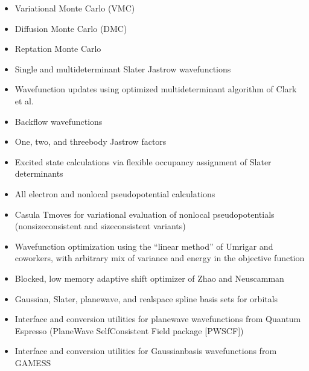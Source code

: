 \documentclass[letterpaper,10pt,english]{sphinxmanual}
\begin{document}
\begin{itemize}
\item {} 
Variational Monte Carlo (VMC)

\item {} 
Diffusion Monte Carlo (DMC)

\item {} 
Reptation Monte Carlo

\item {} 
Single and multideterminant Slater Jastrow wavefunctions

\item {} 
Wavefunction updates using optimized multideterminant algorithm of
Clark et al.

\item {} 
Backflow wavefunctions

\item {} 
One, two, and three\sphinxhyphen{}body Jastrow factors

\item {} 
Excited state calculations via flexible occupancy assignment of
Slater determinants

\item {} 
All electron and nonlocal pseudopotential calculations

\item {} 
Casula T\sphinxhyphen{}moves for variational evaluation of nonlocal
pseudopotentials (non\sphinxhyphen{}size\sphinxhyphen{}consistent and size\sphinxhyphen{}consistent variants)

\item {} 
Wavefunction optimization using the “linear method” of Umrigar and
coworkers, with arbitrary mix of variance and energy in the objective
function

\item {} 
Blocked, low memory adaptive shift optimizer of Zhao and Neuscamman

\item {} 
Gaussian, Slater, plane\sphinxhyphen{}wave, and real\sphinxhyphen{}space spline basis sets for
orbitals

\item {} 
Interface and conversion utilities for plane\sphinxhyphen{}wave wavefunctions from
Quantum Espresso (Plane\sphinxhyphen{}Wave Self\sphinxhyphen{}Consistent Field package {[}PWSCF{]})

\item {} 
Interface and conversion utilities for Gaussian\sphinxhyphen{}basis wavefunctions
from GAMESS


\end{itemize}
\end{document}
